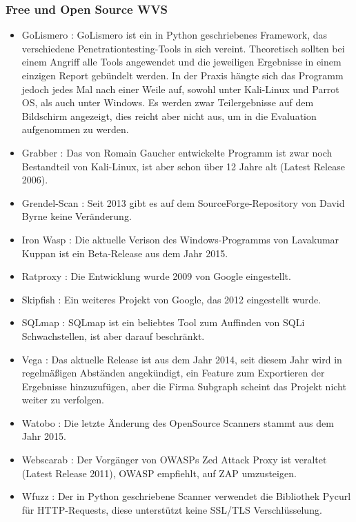 \documentclass[12pt,oneside,a4paper,parskip]{scrbook}
\begin{document}
    \subsubsection{Free und Open Source WVS}
    \begin{itemize}
      \item GoLismero \cite{GoLismero}: GoLismero ist ein in Python geschriebenes Framework, das verschiedene Penetrationtesting-Tools in sich vereint. Theoretisch sollten bei einem Angriff alle Tools angewendet und die jeweiligen Ergebnisse in einem einzigen Report gebündelt werden. In der Praxis hängte sich das Programm jedoch jedes Mal nach einer Weile auf, sowohl unter Kali-Linux und Parrot OS, als auch unter Windows. Es werden zwar Teilergebnisse auf dem Bildschirm angezeigt, dies reicht aber nicht aus, um in die Evaluation aufgenommen zu werden.
      \item Grabber \cite{Grabber}: Das von Romain Gaucher entwickelte Programm ist zwar noch Bestandteil von Kali-Linux, ist aber schon über 12 Jahre alt (Latest Release 2006).
      \item Grendel-Scan \cite{Grendel}: Seit 2013 gibt es auf dem SourceForge-Repository von David Byrne keine Veränderung.
      \item Iron Wasp \cite{Iron}: Die aktuelle Verison des Windows-Programms von Lavakumar Kuppan ist ein Beta-Release aus dem Jahr 2015.
      \item Ratproxy \cite{Ratproxy}: Die Entwicklung wurde 2009 von Google eingestellt.
      \item Skipfish \cite{Skipfish}: Ein weiteres Projekt von Google, das 2012 eingestellt wurde.
      \item SQLmap \cite{SQLmap}: SQLmap ist ein beliebtes Tool zum Auffinden von SQLi Schwachstellen, ist aber darauf beschränkt.
      \item Vega \cite{Vega}: Das aktuelle Release ist aus dem Jahr 2014, seit diesem Jahr wird in regelmäßigen Abständen angekündigt, ein Feature zum Exportieren der Ergebnisse hinzuzufügen, aber die Firma Subgraph scheint das Projekt nicht weiter zu verfolgen.
      \item Watobo \cite{Watobo}: Die letzte Änderung des OpenSource Scanners stammt aus dem Jahr 2015.
      \item Webscarab \cite{Webscarab}: Der Vorgänger von OWASPs Zed Attack Proxy ist veraltet (Latest Release 2011), OWASP empfiehlt, auf ZAP umzusteigen.
      \item Wfuzz \cite{Wfuzz}: Der in Python geschriebene Scanner verwendet die Bibliothek Pycurl für HTTP-Requests, diese unterstützt keine SSL/TLS Verschlüsselung.

\end{itemize}
\end{document}
